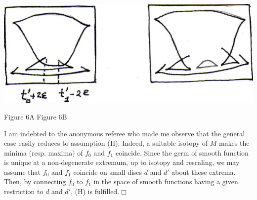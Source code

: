 \documentclass[12pt]{amsart}
\def\bull{\hfill$\Box$\\}
\begin{document}
\begin{center}
\parbox[t]{15cm}{
\hspace{3.5cm} {\includegraphics*[scale=0.4]{reidemeister5-093.jpg}}

\centerline{\rm Figure 6A\hskip 3cm Figure 6B}
}
\end{center}
 \vskip 1cm
 
I am indebted to the anonymous referee who made me observe that the general case easily reduces to assumption (H). Indeed, a suitable isotopy of $M$ makes the minima (resp.  
maxima) of $f_0$ and $f_1$ coincide. Since the germ of smooth
function is unique at a non-degenerate extremum, up to isotopy and 
rescaling,  we may assume that $f_0$ and $f_1$ coincide 
on small discs $d$ and $d'$ about these extrema. Then, by connecting $f_0$ to $f_1$ in the space
of smooth functions having a given restriction to $d$ and $d'$, (H) is fulfilled.\bull
 
\end{document}
